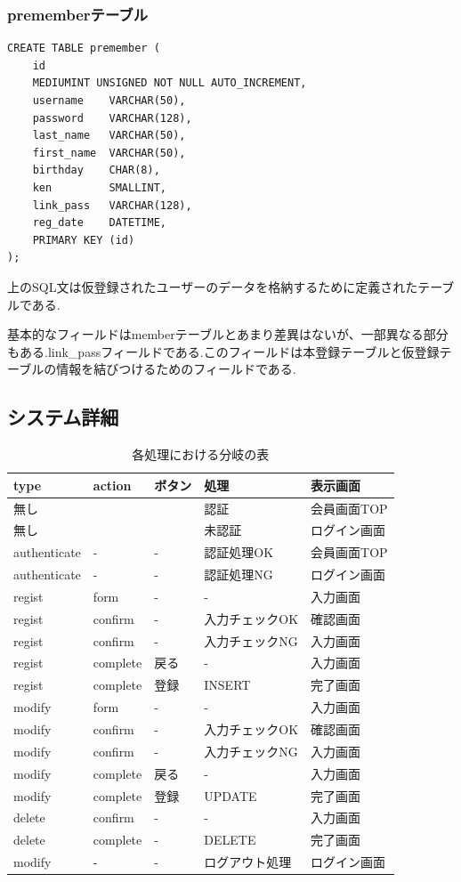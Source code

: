 \documentclass[submit,techrep]{ipsj}
\begin{document}
\subsubsection{prememberテーブル}
\begin{verbatim}
CREATE TABLE premember (
    id          
    MEDIUMINT UNSIGNED NOT NULL AUTO_INCREMENT,
    username   	VARCHAR(50),
    password   	VARCHAR(128),
    last_name  	VARCHAR(50),
    first_name 	VARCHAR(50),
    birthday   	CHAR(8),
    ken         SMALLINT,
    link_pass  	VARCHAR(128),
    reg_date   	DATETIME,
    PRIMARY KEY (id)
);
\end{verbatim}
上のSQL文は仮登録されたユーザーのデータを格納するために定義されたテーブルである.

基本的なフィールドはmemberテーブルとあまり差異はないが、一部異なる部分もある.link\_passフィールドである.このフィールドは本登録テーブルと仮登録テーブルの情報を結びつけるためのフィールドである.

\subsection{システム詳細}



\begin{table}[h]
 \caption{各処理における分岐の表}
 \label{table:SpeedOfLight}
 \centering
  \begin{tabular}{lllll}
   \hline
   type & action & ボタン & 処理 & 表示画面 \\
   \hline \hline
   無し &&& 認証 & 会員画面TOP \\
   無し &&& 未認証 & ログイン画面 \\
   authenticate & - & - & 認証処理OK & 会員画面TOP \\
   authenticate & - & - & 認証処理NG & ログイン画面 \\
   regist & form & - & - & 入力画面 \\
   regist & confirm & - & 入力チェックOK & 確認画面 \\
   regist & confirm & - & 入力チェックNG & 入力画面 \\
   regist & complete & 戻る & - & 入力画面 \\
   regist & complete & 登録 & INSERT & 完了画面 \\
   modify & form & - & - & 入力画面 \\
   modify & confirm & - & 入力チェックOK & 確認画面 \\
   modify & confirm & - & 入力チェックNG & 入力画面 \\
   modify & complete & 戻る & - & 入力画面 \\
   modify & complete & 登録 & UPDATE & 完了画面 \\
   delete & confirm & - & - & 入力画面 \\
   delete & complete & - & DELETE & 完了画面 \\
   modify & - & - & ログアウト処理 & ログイン画面 \\
   \hline
  \end{tabular}
\end{table}
\end{document}
